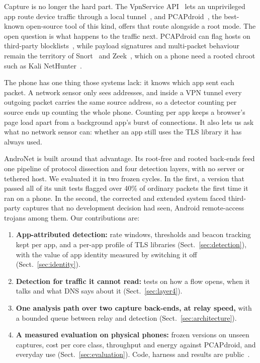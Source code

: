 \documentclass[runningheads]{llncs}
\begin{document}
Capture is no longer the hard part. The VpnService API~\cite{vpnservice} lets an unprivileged app route device traffic through a local tunnel~\cite{antmonitor,razaghpanah}, and PCAPdroid~\cite{pcapdroid}, the best-known open-source tool of this kind, offers that route alongside a root mode. The open question is what happens to the traffic next. PCAPdroid can flag hosts on third-party blocklists~\cite{pcapdroiddocs}, while payload signatures and multi-packet behaviour remain the territory of Snort~\cite{snort} and Zeek~\cite{bro}, which on a phone need a rooted chroot such as Kali NetHunter~\cite{nethunter}.

The phone has one thing those systems lack: it knows which app sent each packet. A network sensor only sees addresses, and inside a VPN tunnel every outgoing packet carries the same source address, so a detector counting per source ends up counting the whole phone. Counting per app keeps a browser's page load apart from a background app's burst of connections. It also lets us ask what no network sensor can: whether an app still uses the TLS library it has always used.

AndroNet is built around that advantage. Its root-free and rooted back-ends feed one pipeline of protocol dissection and four detection layers, with no server or tethered host. We evaluated it in two frozen cycles. In the first, a version that passed all of its unit tests flagged over 40\% of ordinary packets the first time it ran on a phone. In the second, the corrected and extended system faced third-party captures that no development decision had seen, Android remote-access trojans among them. Our contributions are:
\begin{enumerate}
\item \textbf{App-attributed detection:} rate windows, thresholds and beacon tracking kept per app, and a per-app profile of TLS libraries (Sect.~\ref{sec:detection}), with the value of app identity measured by switching it off (Sect.~\ref{sec:identity}).
\item \textbf{Detection for traffic it cannot read:} tests on how a flow opens, when it talks and what DNS says about it (Sect.~\ref{sec:layer4}).
\item \textbf{One analysis path over two capture back-ends, at relay speed,} with a bounded queue between relay and detection (Sect.~\ref{sec:architecture}).
\item \textbf{A measured evaluation on physical phones:} frozen versions on unseen captures, cost per core class, throughput and energy against PCAPdroid, and everyday use (Sect.~\ref{sec:evaluation}). Code, harness and results are public~\cite{repo}.
\end{enumerate}
\end{document}

